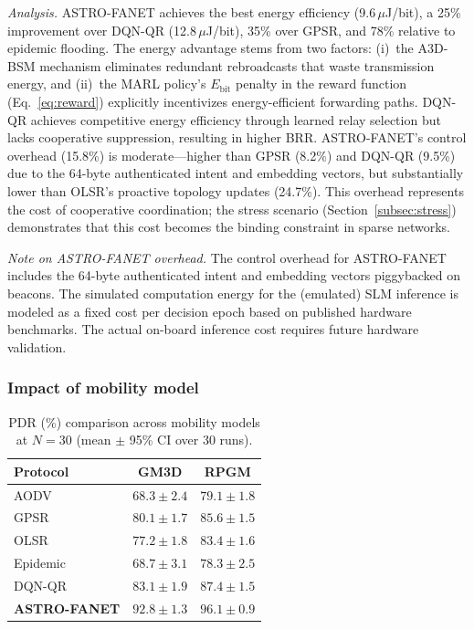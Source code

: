 \documentclass[5p,times]{elsarticle}
\begin{document}
\textit{Analysis.} ASTRO-FANET achieves the best energy efficiency (9.6\,$\mu$J/bit), a 25\% improvement over DQN-QR (12.8\,$\mu$J/bit), 35\% over GPSR, and 78\% relative to epidemic flooding. The energy advantage stems from two factors: (i)~the A3D-BSM mechanism eliminates redundant rebroadcasts that waste transmission energy, and (ii)~the MARL policy's $E_{\mathrm{bit}}$ penalty in the reward function (Eq.~\eqref{eq:reward}) explicitly incentivizes energy-efficient forwarding paths. DQN-QR achieves competitive energy efficiency through learned relay selection but lacks cooperative suppression, resulting in higher BRR. ASTRO-FANET's control overhead (15.8\%) is moderate---higher than GPSR (8.2\%) and DQN-QR (9.5\%) due to the 64-byte authenticated intent and embedding vectors, but substantially lower than OLSR's proactive topology updates (24.7\%). This overhead represents the cost of cooperative coordination; the stress scenario (Section~\ref{subsec:stress}) demonstrates that this cost becomes the binding constraint in sparse networks.

\textit{Note on ASTRO-FANET overhead.} The control overhead for ASTRO-FANET includes the 64-byte authenticated intent and embedding vectors piggybacked on beacons. The simulated computation energy for the (emulated) SLM inference is modeled as a fixed cost per decision epoch based on published hardware benchmarks. The actual on-board inference cost requires future hardware validation.

\subsubsection{Impact of mobility model}

\begin{table}[t]
\centering
\caption{PDR (\%) comparison across mobility models at $N=30$ (mean $\pm$ 95\% CI over 30 runs).}
\label{tab:mobility_comparison}
\scriptsize
\begin{tabular}{lcc}
\toprule
Protocol & GM3D & RPGM \\
\midrule
AODV & $68.3 \pm 2.4$ & $79.1 \pm 1.8$ \\
GPSR & $80.1 \pm 1.7$ & $85.6 \pm 1.5$ \\
OLSR & $77.2 \pm 1.8$ & $83.4 \pm 1.6$ \\
Epidemic & $68.7 \pm 3.1$ & $78.3 \pm 2.5$ \\
DQN-QR & $83.1 \pm 1.9$ & $87.4 \pm 1.5$ \\
\textbf{ASTRO-FANET} & $\mathbf{92.8 \pm 1.3}$ & $\mathbf{96.1 \pm 0.9}$ \\
\bottomrule
\end{tabular}
\end{table}
\end{document}
